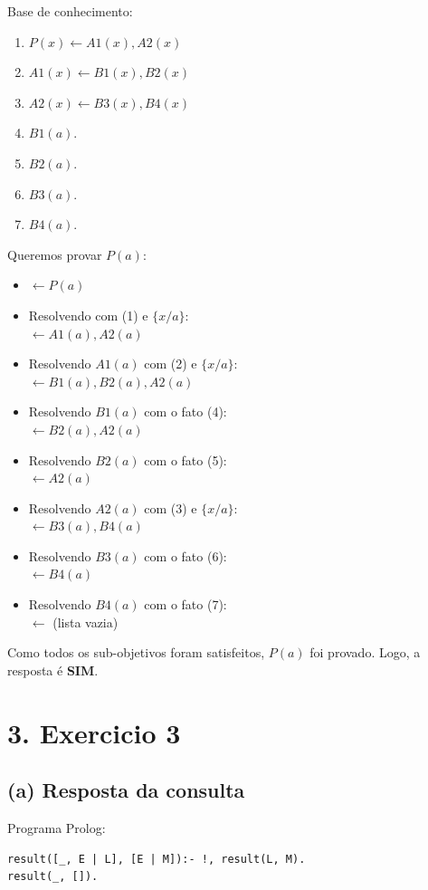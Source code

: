 \documentclass{article}
\begin{document}
Base de conhecimento:
\begin{enumerate}
    \item $P(x) \leftarrow A1(x), A2(x)$
    \item $A1(x) \leftarrow B1(x), B2(x)$
    \item $A2(x) \leftarrow B3(x), B4(x)$
    \item $B1(a).$
    \item $B2(a).$
    \item $B3(a).$
    \item $B4(a).$
\end{enumerate}

Queremos provar $P(a)$:
\begin{itemize}
    \item[G0:] $\leftarrow P(a)$
    \item[G1:] Resolvendo com (1) e $\{x/a\}$: \\
    $\leftarrow A1(a), A2(a)$
    \item[G2:] Resolvendo $A1(a)$ com (2) e $\{x/a\}$: \\
    $\leftarrow B1(a), B2(a), A2(a)$
    \item[G3:] Resolvendo $B1(a)$ com o fato (4): \\
    $\leftarrow B2(a), A2(a)$
    \item[G4:] Resolvendo $B2(a)$ com o fato (5): \\
    $\leftarrow A2(a)$
    \item[G5:] Resolvendo $A2(a)$ com (3) e $\{x/a\}$: \\
    $\leftarrow B3(a), B4(a)$
    \item[G6:] Resolvendo $B3(a)$ com o fato (6): \\
    $\leftarrow B4(a)$
    \item[G7:] Resolvendo $B4(a)$ com o fato (7): \\
    $\leftarrow$ (lista vazia)
\end{itemize}
Como todos os sub-objetivos foram satisfeitos, $P(a)$ foi provado. Logo, a resposta é \textbf{SIM}.

\newpage
\section*{3. Exercicio 3}

\subsection*{(a) Resposta da consulta}
Programa Prolog:
\begin{verbatim}
result([_, E | L], [E | M]):- !, result(L, M).
result(_, []).
\end{verbatim}
\end{document}
